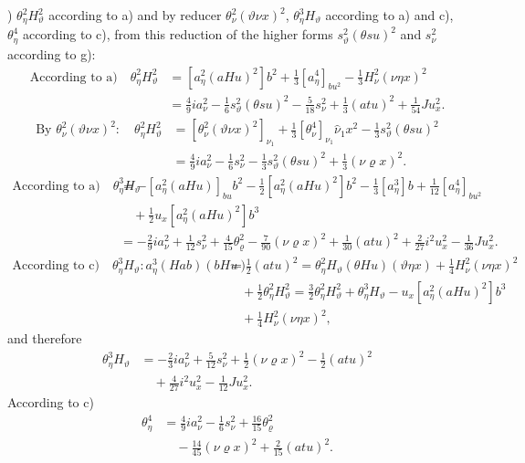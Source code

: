 \documentclass[11pt]{article}
\newcommand{\R}{\varrho}
\begin{document}
) $\theta_\eta^2H_\vartheta^2$ according to a) and by reducer $\theta_\nu^2(\vartheta\nu x)^2$, $\theta_\eta^3H_\vartheta$ according to a) and c), $\theta_\eta^4$ according to c), from this reduction of the higher forms $s_\vartheta^2(\theta su)^2$ and $s_\nu^2$ according to g):
\[
\begin{aligned}
\text{According to a)}\quad
\theta_\eta^2H_\vartheta^2&=[a_\eta^2(aHu)^2]b^2+\frac13[a_\eta^4]_{bu^2}-\frac13H_\nu^2(\nu\eta x)^2\\
&=\frac49ia_\nu^2-\frac16s_\vartheta^2(\theta su)^2-\frac5{18}s_\nu^2+\frac13(atu)^2+\frac1{54}Ju_x^2.
\end{aligned}
\]
\[
\begin{aligned}
\text{By }\theta_\nu^2(\vartheta\nu x)^2:
\quad\theta_\eta^2H_\vartheta^2
&=[\theta_\nu^2(\vartheta\nu x)^2]_{\nu_1}+\frac13[\theta_\nu^4]_{\nu_1}\hat\nu_1x^2-\frac13s_\vartheta^2(\theta su)^2\\
&=\frac49ia_\nu^2-\frac16s_\nu^2-\frac13s_\vartheta^2(\theta su)^2+\frac13(\nu\R x)^2.
\end{aligned}
\]
\[
\begin{aligned}
\text{According to a)}\quad
\theta_\eta^3H_\vartheta&=-[a_\eta^2(aHu)]_{bu}b^2-\frac12[a_\eta^2(aHu)^2]b^2-\frac13[a_\eta^3]b+\frac1{12}[a_\eta^4]_{bu^2}\\
&\quad+\frac12u_x[a_\eta^2(aHu)^2]b^3\\
&=-\frac29ia_\nu^2+\frac1{12}s_\nu^2+\frac4{15}\theta_\R^2-\frac7{90}(\nu\R x)^2+\frac1{30}(atu)^2+\frac2{27}i^2u_x^2-\frac1{36}Ju_x^2.
\end{aligned}
\]
\[
\begin{aligned}
\text{According to c)}\quad
\theta_\eta^3H_\vartheta:
 a_\eta^3(Hab)(bHu)&=\frac12(atu)^2
=\theta_\eta^2H_\vartheta(\theta Hu)(\vartheta\eta x)+\frac14H_\nu^2(\nu\eta x)^2\\
&\quad+\frac12\theta_\eta^2H_\vartheta^2
=\frac32\theta_\eta^2H_\vartheta^2+\theta_\eta^3H_\vartheta-u_x[a_\eta^2(aHu)^2]b^3\\
&\quad+\frac14H_\nu^2(\nu\eta x)^2,
\end{aligned}
\]
and therefore
\[
\begin{aligned}
\theta_\eta^3H_\vartheta&=-\frac23ia_\nu^2+\frac5{12}s_\nu^2+\frac12(\nu\R x)^2-\frac12(atu)^2\\
&\quad+\frac4{27}i^2u_x^2-\frac1{12}Ju_x^2.
\end{aligned}
\]
According to c)
\[
\begin{aligned}
\theta_\eta^4&=\frac49ia_\nu^2-\frac16s_\nu^2+\frac{16}{15}\theta_\R^2\\
&\quad-\frac{14}{45}(\nu\R x)^2+\frac2{15}(atu)^2.
\end{aligned}
\]
\end{document}

